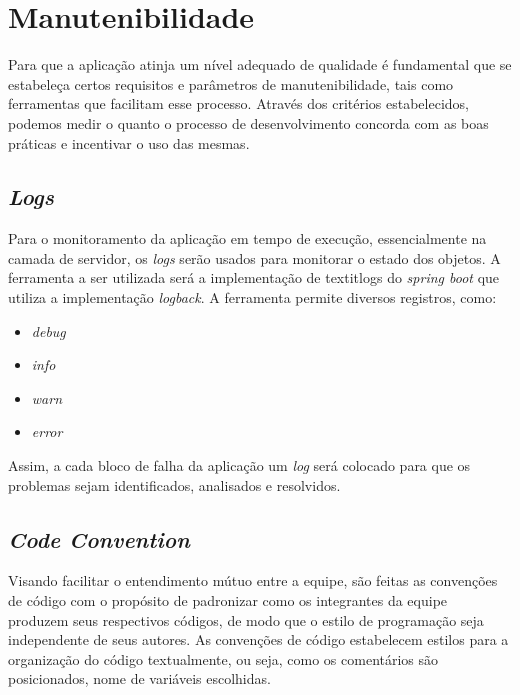 \section{Manutenibilidade}
Para que a aplicação atinja um nível adequado de qualidade é fundamental
que se estabeleça certos requisitos e parâmetros de manutenibilidade, tais como
ferramentas que facilitam esse processo. Através dos critérios estabelecidos, podemos
medir o quanto o processo de desenvolvimento concorda com as boas práticas e incentivar o uso das mesmas.

\subsection{\textit{Logs}}
Para o monitoramento da aplicação em tempo de execução, essencialmente na camada de servidor,
os \textit{logs} serão usados para monitorar o estado dos objetos. A ferramenta a ser utilizada
será a implementação de textit{logs} do \textit{\gls{spring boot}} que utiliza a implementação \textit{\gls{logback}}.
A ferramenta permite diversos registros, como:

\begin{itemize}
    \item \textit{debug} 
    \item \textit{info}
    \item \textit{warn} 
    \item \textit{error}
\end{itemize}

Assim, a cada bloco de falha da aplicação um \textit{log} será colocado para que os problemas sejam identificados,
analisados e resolvidos.

\subsection{\textit{Code Convention}}
Visando facilitar o entendimento mútuo entre a equipe, são feitas as convenções de código com o propósito de padronizar como os integrantes da equipe produzem seus respectivos códigos, de modo que o estilo de programação seja independente de seus autores.
As convenções de código estabelecem estilos para a organização do código textualmente, ou seja, como os comentários são posicionados, nome de variáveis escolhidas.

